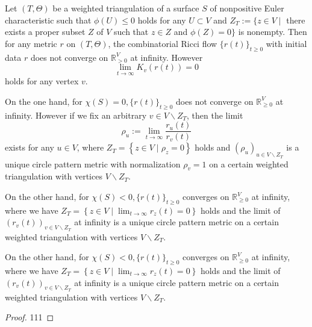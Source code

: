\begin{theorem}\label{Asuka-Takatsu--theorem}
  Let $ (T, \Theta) $ be a weighted triangulation of a surface $ S $ of nonpositive Euler characteristic such that $ \phi(U) \leq 0 $ holds for any $ U \subset V $ and $ Z_{T}:=\{z \in V \mid $ there exists a proper subset $ Z $ of $ V $ such that $ z \in Z $ and $ \phi(Z)=0\} $ is nonempty. Then for any metric $ r $ on $ (T, \Theta) $, the combinatorial Ricci flow $ \{r(t)\}_{t \geq 0} $ with initial data $ r $ does not converge on $ \mathbb{R}_{>0}^{V} $ at infinity. However
  $$
  \lim _{t \rightarrow \infty} K_{v}(r(t))=0
  $$
  holds for any vertex $ v $.

  On the one hand, for $ \chi(S)=0,\{r(t)\}_{t \geq 0} $ does not converge on $ \mathbb{R}_{\geq 0}^{V} $ at infinity. However if we fix an arbitrary $ v \in V \backslash Z_{T} $, then the limit
  $$
  \rho_{u}:=\lim _{t \rightarrow \infty} \frac{r_{u}(t)}{r_{v}(t)}
  $$
  exists for any $ u \in V $, where $ Z_{T}=\left\{z \in V \mid \rho_{z}=0\right\} $ holds and $ \left(\rho_{u}\right)_{u \in V \backslash Z_{T}} $ is a unique circle pattern metric with normalization $ \rho_{v}=1 $ on a certain weighted triangulation with vertices $ V \backslash Z_{T} $.

  On the other hand, for $ \chi(S)<0,\{r(t)\}_{t \geq 0} $ converges on $ \mathbb{R}_{\geq 0}^{V} $ at infinity, where we have $ Z_{T}=\left\{z \in V \mid \lim _{t \rightarrow \infty} r_{z}(t)=0\right\} $ holds and the limit of $ \left(r_{v}(t)\right)_{v \in V \backslash Z_{T}} $ at infinity is a unique circle pattern metric on a certain weighted triangulation with vertices $ V \backslash Z_{T} $.

  On the other hand, for $ \chi(S)<0,\{r(t)\}_{t \geq 0} $ converges on $ \mathbb{R}_{\geq 0}^{V} $ at infinity, where we have $ Z_{T}=\left\{z \in V \mid \lim _{t \rightarrow \infty} r_{z}(t)=0\right\} $ holds and the limit of $ \left(r_{v}(t)\right)_{v \in V \backslash Z_{T}} $ at infinity is a unique circle pattern metric on a certain weighted triangulation with vertices $ V \backslash Z_{T} $.
\end{theorem}

\begin{proof}
  111
\end{proof}
